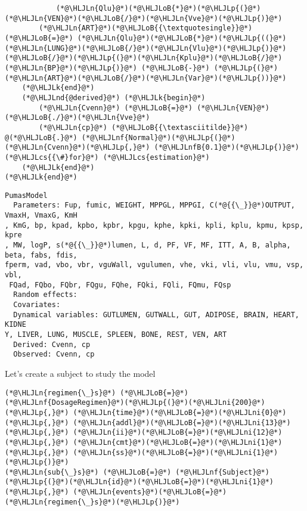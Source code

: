 \documentclass[12pt,a4paper]{article}
\newcommand{\HLJLk}[1]{\textcolor[RGB]{148,91,176}{\textbf{#1}}}
\newcommand{\HLJLn}[1]{#1}
\newcommand{\HLJLnd}[1]{\textcolor[RGB]{214,102,97}{#1}}
\newcommand{\HLJLnf}[1]{\textcolor[RGB]{66,102,213}{#1}}
\newcommand{\HLJLnfB}[1]{\textcolor[RGB]{59,151,46}{#1}}
\newcommand{\HLJLni}[1]{\textcolor[RGB]{59,151,46}{#1}}
\newcommand{\HLJLoB}[1]{\textcolor[RGB]{102,102,102}{\textbf{#1}}}
\newcommand{\HLJLp}[1]{#1}
\newcommand{\HLJLcs}[1]{\textcolor[RGB]{153,153,119}{\textit{#1}}}
\begin{document}
\begin{lstlisting}
            (*@\HLJLn{Qlu}@*)(*@\HLJLoB{*}@*)(*@\HLJLp{(}@*)(*@\HLJLn{VEN}@*)(*@\HLJLoB{/}@*)(*@\HLJLn{Vve}@*)(*@\HLJLp{)}@*)
        (*@\HLJLn{ART}@*)(*@\HLJLoB{{\textquotesingle}}@*) (*@\HLJLoB{=}@*) (*@\HLJLn{Qlu}@*)(*@\HLJLoB{*}@*)(*@\HLJLp{((}@*)(*@\HLJLn{LUNG}@*)(*@\HLJLoB{/}@*)(*@\HLJLn{Vlu}@*)(*@\HLJLp{)}@*)(*@\HLJLoB{/}@*)(*@\HLJLp{(}@*)(*@\HLJLn{Kplu}@*)(*@\HLJLoB{/}@*)(*@\HLJLn{BP}@*)(*@\HLJLp{)}@*) (*@\HLJLoB{-}@*) (*@\HLJLp{(}@*)(*@\HLJLn{ART}@*)(*@\HLJLoB{/}@*)(*@\HLJLn{Var}@*)(*@\HLJLp{))}@*)
    (*@\HLJLk{end}@*)
    (*@\HLJLnd{@derived}@*) (*@\HLJLk{begin}@*)
        (*@\HLJLn{Cvenn}@*) (*@\HLJLoB{=}@*) (*@\HLJLn{VEN}@*)(*@\HLJLoB{./}@*)(*@\HLJLn{Vve}@*)
        (*@\HLJLn{cp}@*) (*@\HLJLoB{{\textasciitilde}}@*) @(*@\HLJLoB{.}@*) (*@\HLJLnf{Normal}@*)(*@\HLJLp{(}@*)(*@\HLJLn{Cvenn}@*)(*@\HLJLp{,}@*) (*@\HLJLnfB{0.1}@*)(*@\HLJLp{)}@*) (*@\HLJLcs{{\#}for}@*) (*@\HLJLcs{estimation}@*)
    (*@\HLJLk{end}@*)
(*@\HLJLk{end}@*)
\end{lstlisting}

\begin{lstlisting}
PumasModel
  Parameters: Fup, fumic, WEIGHT, MPPGL, MPPGI, C(*@{{\_}}@*)OUTPUT, VmaxH, VmaxG, KmH
, KmG, bp, kpad, kpbo, kpbr, kpgu, kphe, kpki, kpli, kplu, kpmu, kpsp, kpre
, MW, logP, s(*@{{\_}}@*)lumen, L, d, PF, VF, MF, ITT, A, B, alpha, beta, fabs, fdis, 
fperm, vad, vbo, vbr, vguWall, vgulumen, vhe, vki, vli, vlu, vmu, vsp, vbl,
 FQad, FQbo, FQbr, FQgu, FQhe, FQki, FQli, FQmu, FQsp
  Random effects: 
  Covariates: 
  Dynamical variables: GUTLUMEN, GUTWALL, GUT, ADIPOSE, BRAIN, HEART, KIDNE
Y, LIVER, LUNG, MUSCLE, SPLEEN, BONE, REST, VEN, ART
  Derived: Cvenn, cp
  Observed: Cvenn, cp
\end{lstlisting}


Let's create a subject to study the model


\begin{lstlisting}
(*@\HLJLn{regimen{\_}s}@*) (*@\HLJLoB{=}@*) (*@\HLJLnf{DosageRegimen}@*)(*@\HLJLp{(}@*)(*@\HLJLni{200}@*)(*@\HLJLp{,}@*) (*@\HLJLn{time}@*)(*@\HLJLoB{=}@*)(*@\HLJLni{0}@*)(*@\HLJLp{,}@*) (*@\HLJLn{addl}@*)(*@\HLJLoB{=}@*)(*@\HLJLni{13}@*)(*@\HLJLp{,}@*) (*@\HLJLn{ii}@*)(*@\HLJLoB{=}@*)(*@\HLJLni{12}@*)(*@\HLJLp{,}@*) (*@\HLJLn{cmt}@*)(*@\HLJLoB{=}@*)(*@\HLJLni{1}@*)(*@\HLJLp{,}@*) (*@\HLJLn{ss}@*)(*@\HLJLoB{=}@*)(*@\HLJLni{1}@*)(*@\HLJLp{)}@*)
(*@\HLJLn{sub{\_}s}@*) (*@\HLJLoB{=}@*) (*@\HLJLnf{Subject}@*)(*@\HLJLp{(}@*)(*@\HLJLn{id}@*)(*@\HLJLoB{=}@*)(*@\HLJLni{1}@*)(*@\HLJLp{,}@*) (*@\HLJLn{events}@*)(*@\HLJLoB{=}@*)(*@\HLJLn{regimen{\_}s}@*)(*@\HLJLp{)}@*)
\end{lstlisting}
\end{document}
